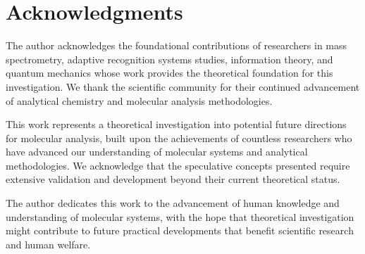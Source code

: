 \documentclass[11pt,a4paper]{article}
\theoremstyle{remark}
\begin{document}
\section*{Acknowledgments}

The author acknowledges the foundational contributions of researchers in mass spectrometry, adaptive recognition systems studies, information theory, and quantum mechanics whose work provides the theoretical foundation for this investigation. We thank the scientific community for their continued advancement of analytical chemistry and molecular analysis methodologies.

This work represents a theoretical investigation into potential future directions for molecular analysis, built upon the achievements of countless researchers who have advanced our understanding of molecular systems and analytical methodologies. We acknowledge that the speculative concepts presented require extensive validation and development beyond their current theoretical status.

The author dedicates this work to the advancement of human knowledge and understanding of molecular systems, with the hope that theoretical investigation might contribute to future practical developments that benefit scientific research and human welfare.
\end{document}
